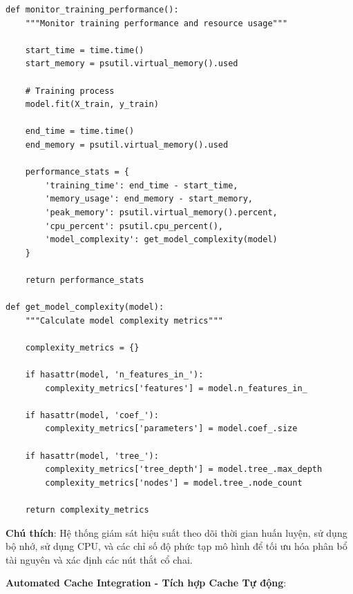 \begin{verbatim}
def monitor_training_performance():
    """Monitor training performance and resource usage"""
    
    start_time = time.time()
    start_memory = psutil.virtual_memory().used
    
    # Training process
    model.fit(X_train, y_train)
    
    end_time = time.time()
    end_memory = psutil.virtual_memory().used
    
    performance_stats = {
        'training_time': end_time - start_time,
        'memory_usage': end_memory - start_memory,
        'peak_memory': psutil.virtual_memory().percent,
        'cpu_percent': psutil.cpu_percent(),
        'model_complexity': get_model_complexity(model)
    }
    
    return performance_stats

def get_model_complexity(model):
    """Calculate model complexity metrics"""
    
    complexity_metrics = {}
    
    if hasattr(model, 'n_features_in_'):
        complexity_metrics['features'] = model.n_features_in_
    
    if hasattr(model, 'coef_'):
        complexity_metrics['parameters'] = model.coef_.size
    
    if hasattr(model, 'tree_'):
        complexity_metrics['tree_depth'] = model.tree_.max_depth
        complexity_metrics['nodes'] = model.tree_.node_count
    
    return complexity_metrics
\end{verbatim}

\textbf{Chú thích}: Hệ thống giám sát hiệu suất theo dõi thời gian huấn luyện, sử dụng bộ nhớ, sử dụng CPU, và các chỉ số độ phức tạp mô hình để tối ưu hóa phân bổ tài nguyên và xác định các nút thắt cổ chai.

\textbf{Automated Cache Integration - Tích hợp Cache Tự động}:

